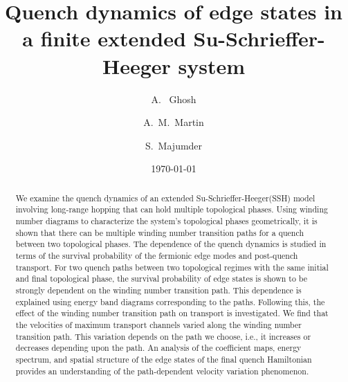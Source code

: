 \documentclass[aps,pra,reprint,superscriptaddress,longbibliography]{revtex4-2}
\begin{document}
    
	\title{Quench dynamics of edge states in a finite extended Su-Schrieffer-Heeger system}%
	
	\author{A.~ Ghosh}
		
	
	
	\author{A.~M.~Martin}
	
	
	
	\author{S.~Majumder}
	
	
	\date{\today}
	
	
	\begin{abstract}
		
	We examine the quench dynamics of an extended Su-Schrieffer-Heeger(SSH) model involving long-range hopping that can hold multiple topological phases. Using winding number diagrams to characterize the system's topological phases geometrically, it is shown that there can be multiple winding number transition paths for a quench between two topological phases. The dependence of the quench dynamics is studied in terms of the survival probability of the fermionic edge modes and post-quench transport. For two quench paths between two topological regimes with the same initial and final topological phase, the survival probability of edge states is shown to be strongly dependent on the winding number transition path. This dependence is explained using energy band diagrams corresponding to the paths. Following this, the effect of the winding number transition path on transport is investigated. We find that the velocities of maximum transport channels varied along the winding number transition path. This variation depends on the path we choose, i.e., it increases or decreases depending upon the path. An analysis of the coefficient maps, energy spectrum, and spatial structure of the edge states of the final quench Hamiltonian provides an understanding of the path-dependent velocity variation phenomenon. 
		
	\end{abstract}
	
	\maketitle
	
\end{document}
